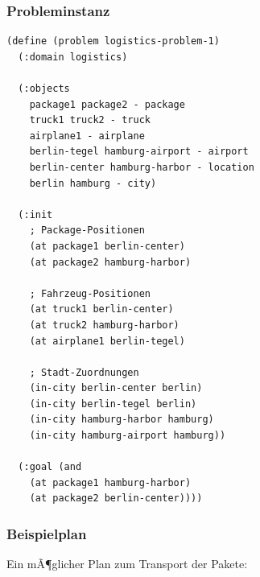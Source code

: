 ﻿\documentclass[a4paper,12pt]{article}
\theoremstyle{definition}
\begin{document}
\subsubsection{Probleminstanz}

\begin{lstlisting}[language=PDDL, caption=Logistics Problem]
(define (problem logistics-problem-1)
  (:domain logistics)
  
  (:objects
    package1 package2 - package
    truck1 truck2 - truck
    airplane1 - airplane
    berlin-tegel hamburg-airport - airport
    berlin-center hamburg-harbor - location
    berlin hamburg - city)
  
  (:init
    ; Package-Positionen
    (at package1 berlin-center)
    (at package2 hamburg-harbor)
    
    ; Fahrzeug-Positionen
    (at truck1 berlin-center)
    (at truck2 hamburg-harbor)
    (at airplane1 berlin-tegel)
    
    ; Stadt-Zuordnungen
    (in-city berlin-center berlin)
    (in-city berlin-tegel berlin)
    (in-city hamburg-harbor hamburg)
    (in-city hamburg-airport hamburg))
  
  (:goal (and
    (at package1 hamburg-harbor)
    (at package2 berlin-center))))
\end{lstlisting}

\subsubsection{Beispielplan}

Ein mÃ¶glicher Plan zum Transport der Pakete:
\end{document}
